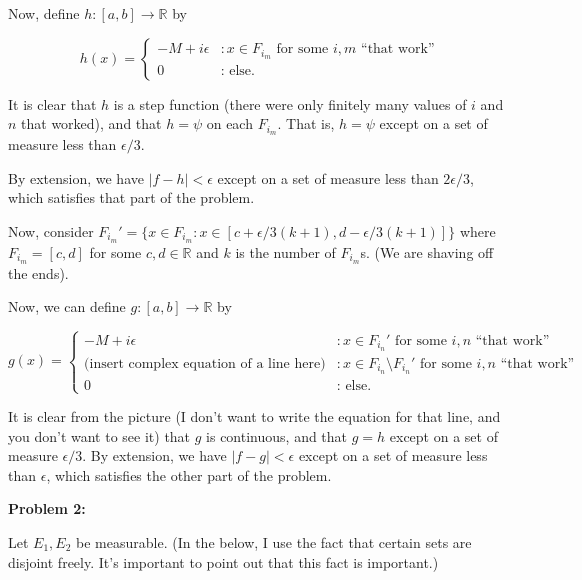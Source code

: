 \documentclass[a4paper,12pt]{article}
\newcommand{\shunt}{\vspace{20mm}}
\newcommand{\absval}[1]{\left\lvert #1 \right\rvert}
\newcommand{\ep}{\epsilon}
\newcommand{\R}{\mathbb{R}}
\begin{document}
Now, define $h: [a,b] \to \R$ by

\begin{displaymath}
   h(x) = \left\{
     \begin{array}{lr}
       -M+i\ep & : x \in F_{i_m} \text { for some $i, m$ ``that work''}\\
       0 & : \text{ else.}
     \end{array}
   \right.
\end{displaymath}

It is clear that $h$ is a step function (there were only finitely many values of $i$ and $n$ that worked), and that $h = \psi$ on each $F_{i_m}$. That is, $h = \psi$ except on a set of measure less than $\ep/3$.

By extension, we have $\absval{f-h} < \ep$ except on a set of measure less than $2\ep/3$, which satisfies that part of the problem.

Now, consider $F_{i_m}' = \{x \in F_{i_m} : x \in [c+\ep/3(k+1),d-\ep/3(k+1)]\}$ where $F_{i_m} = [c,d]$ for some $c,d \in \R$ and $k$ is the number of $F_{i_m}$s. (We are shaving off the ends).

Now, we can define $g: [a,b] \to \R$ by

\begin{displaymath}
   g(x) = \left\{
     \begin{array}{lr}
       -M+i\ep & : x \in F_{i_n}' \text { for some $i, n$ ``that work''}\\
       \text{(insert complex equation of a line here)} & : x \in F_{i_n} \setminus F_{i_n}' \text { for some $i, n$ ``that work''}\\
       0 & : \text{ else.}
     \end{array}
   \right.
\end{displaymath}

\shunt %

It is clear from the picture (I don't want to write the equation for that line, and you don't want to see it) that $g$ is continuous, and that $g = h$ except on a set of measure $\ep/3$. By extension, we have $\absval{f-g} < \ep$ except on a set of measure less than $\ep$, which satisfies the other part of the problem.

\shunt

{\bf Problem 2:}

Let $E_1, E_2$ be measurable. (In the below, I use the fact that certain sets are disjoint freely. It's important to point out that this fact is important.)
\end{document}
